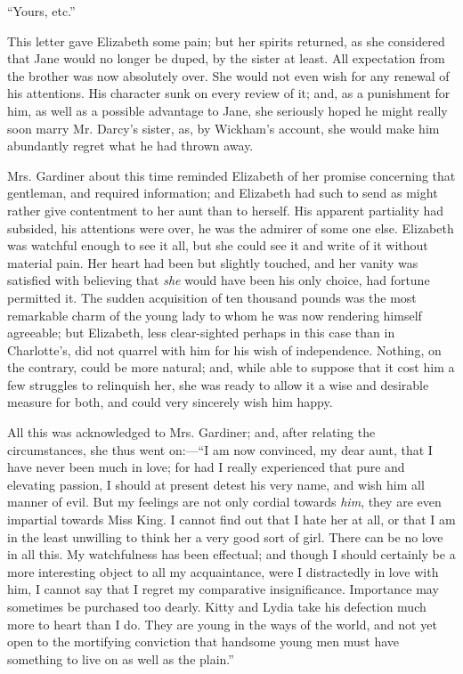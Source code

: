 \documentclass[12pt,openright]{book}
\begin{document}
“Yours, etc.”


This letter gave Elizabeth some pain; but her spirits returned, as she considered that Jane would no longer be duped, by the sister at least. All expectation from the brother was now absolutely over. She would not even wish for any renewal of his attentions. His character sunk on every review of it; and, as a punishment for him, as well as a possible advantage to Jane, she seriously hoped he might really soon marry Mr. Darcy’s sister, as, by Wickham’s account, she would make him abundantly regret what he had thrown away.

Mrs. Gardiner about this time reminded Elizabeth of her promise concerning that gentleman, and required information; and Elizabeth had such to send as might rather give contentment to her aunt than to herself. His apparent partiality had subsided, his attentions were over, he was the admirer of some one else. Elizabeth was watchful enough to see it all, but she could see it and write of it without material pain. Her heart had been but slightly touched, and her vanity was satisfied with believing that \textit{she} would have been his only choice, had fortune permitted it. The sudden acquisition of ten thousand pounds was the most remarkable charm of the young lady to whom he was now rendering himself agreeable; but Elizabeth, less clear-sighted perhaps in this case than in Charlotte’s, did not quarrel with him for his wish of independence. Nothing, on the contrary, could be more natural; and, while able to suppose that it cost him a few struggles to relinquish her, she was ready to allow it a wise and desirable measure for both, and could very sincerely wish him happy.

All this was acknowledged to Mrs. Gardiner; and, after relating the circumstances, she thus went on:—“I am now convinced, my dear aunt, that I have never been much in love; for had I really experienced that pure and elevating passion, I should at present detest his very name, and wish him all manner of evil. But my feelings are not only cordial towards \textit{him}, they are even impartial towards Miss King. I cannot find out that I hate her at all, or that I am in the least unwilling to think her a very good sort of girl. There can be no love in all this. My watchfulness has been effectual; and though I should certainly be a more interesting object to all my acquaintance, were I distractedly in love with him, I cannot say that I regret my comparative insignificance. Importance may sometimes be purchased too dearly. Kitty and Lydia take his defection much more to heart than I do. They are young in the ways of the world, and not yet open to the mortifying conviction that handsome young men must have something to live on as well as the plain.”
\end{document}
